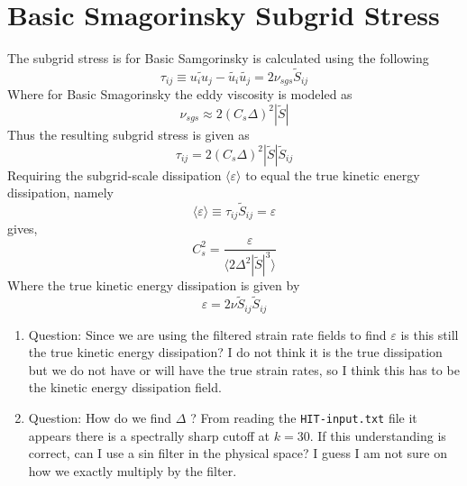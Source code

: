 \documentclass[12pt]{article}
\begin{document}
\section{Basic Smagorinsky Subgrid Stress}
The subgrid stress is for Basic Samgorinsky is calculated using the following
\begin{equation}
    \tau_{ij} \equiv \widetilde{u_i u_j} - \widetilde{u_i} \widetilde{u_j}
                = 2 \nu_{sgs} \widetilde{S}_{ij}
    \label{eq:tauij}
\end{equation}
Where for Basic Smagorinsky the eddy viscosity is modeled as  
\begin{equation}
    \nu_{sgs} \approx 2 \left(C_{s} \Delta \right)^{2} \left| \widetilde{S} \right|
    \label{eq:nu-sgs}
\end{equation}
Thus the resulting subgrid stress is given as
\begin{equation}
    \tau_{ij} = 2 \left(C_{s} \Delta \right)^{2} \left| \widetilde{S} \right|\widetilde{S}_{ij}
    \label{eq:tauij-2}
\end{equation}
Requiring the subgrid-scale dissipation $\langle \varepsilon \rangle$ to equal the true kinetic
energy dissipation, namely 
\begin{equation}
    \langle \varepsilon \rangle \equiv \tau_{ij} \widetilde{S}_{ij} = \varepsilon
    \label{eq:subgrid-diss}
\end{equation}
gives,
\begin{equation}
    C_{s}^{2} = \frac{\varepsilon}{\Big \langle 2 \Delta^{2} \left| \widetilde{S} \right| ^{3} \Big \rangle}
    \label{eq:cs}
\end{equation}
Where the true kinetic energy dissipation is given by 
\begin{equation}
    \varepsilon = 2 \nu \widetilde{S}_{ij} \widetilde{S}_{ij}
    \label{eq:dissp-rate}
\end{equation}
\begin{enumerate}
    \item   {\color{red} Question: Since we are using the filtered strain rate fields to find
        $\varepsilon$ is this still the true kinetic energy dissipation? I do not think it is the
        true dissipation but we do not have or will have the true strain rates, so I think this has
        to be the kinetic energy dissipation field.}
    \item {\color{red}Question: How do we find $\Delta$ ? From reading the \texttt{HIT-input.txt}
        file it appears there is a spectrally sharp cutoff at $k=30$. If this understanding is
        correct, can I use a sin filter in the physical space? I guess I am not sure on how we
        exactly multiply by the filter. }
\end{enumerate}
\end{document}
